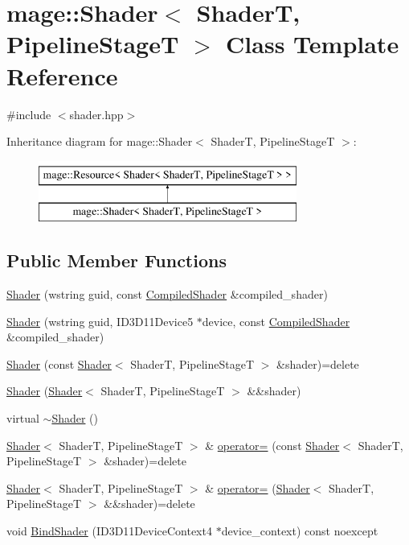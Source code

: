 \hypertarget{classmage_1_1_shader}{}\section{mage\+:\+:Shader$<$ ShaderT, Pipeline\+StageT $>$ Class Template Reference}
\label{classmage_1_1_shader}


{\ttfamily \#include $<$shader.\+hpp$>$}

Inheritance diagram for mage\+:\+:Shader$<$ ShaderT, Pipeline\+StageT $>$\+:\begin{figure}[H]
\begin{center}
\leavevmode
\includegraphics[height=2.000000cm]{classmage_1_1_shader}
\end{center}
\end{figure}
\subsection*{Public Member Functions}
\begin{DoxyCompactItemize}
\item 
\hyperlink{classmage_1_1_shader_a70caa62e6ea79bd63e2d825850c4d6dc}{Shader} (wstring guid, const \hyperlink{structmage_1_1_compiled_shader}{Compiled\+Shader} \&compiled\+\_\+shader)
\item 
\hyperlink{classmage_1_1_shader_a7f8d27e6e1e74e8aca55e854178dd0e5}{Shader} (wstring guid, I\+D3\+D11\+Device5 $\ast$device, const \hyperlink{structmage_1_1_compiled_shader}{Compiled\+Shader} \&compiled\+\_\+shader)
\item 
\hyperlink{classmage_1_1_shader_a512a10b41172e984d8f6983497bcc9e5}{Shader} (const \hyperlink{classmage_1_1_shader}{Shader}$<$ ShaderT, Pipeline\+StageT $>$ \&shader)=delete
\item 
\hyperlink{classmage_1_1_shader_a9d87b88ded8e6874d061cb8c54d6a5e9}{Shader} (\hyperlink{classmage_1_1_shader}{Shader}$<$ ShaderT, Pipeline\+StageT $>$ \&\&shader)
\item 
virtual \hyperlink{classmage_1_1_shader_a10a954f75331d93c9549b2db5a2c838e}{$\sim$\+Shader} ()
\item 
\hyperlink{classmage_1_1_shader}{Shader}$<$ ShaderT, Pipeline\+StageT $>$ \& \hyperlink{classmage_1_1_shader_a235c45ff470f15367cc7381da0f01130}{operator=} (const \hyperlink{classmage_1_1_shader}{Shader}$<$ ShaderT, Pipeline\+StageT $>$ \&shader)=delete
\item 
\hyperlink{classmage_1_1_shader}{Shader}$<$ ShaderT, Pipeline\+StageT $>$ \& \hyperlink{classmage_1_1_shader_a2fa066425e397523b3ce181e5dc46c9d}{operator=} (\hyperlink{classmage_1_1_shader}{Shader}$<$ ShaderT, Pipeline\+StageT $>$ \&\&shader)=delete
\item 
void \hyperlink{classmage_1_1_shader_ae21e9f9a4e97d8d73f3988815c1cb205}{Bind\+Shader} (I\+D3\+D11\+Device\+Context4 $\ast$device\+\_\+context) const noexcept
\end{DoxyCompactItemize}
